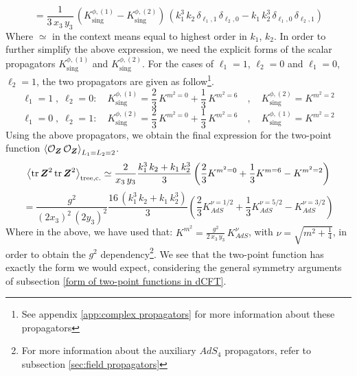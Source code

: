 %
%
\begin{equation}
=
\frac{1}{3 \, x_3 \, y_3} \,
\left(
K^{\phi,(1)}_{\mathrm{sing}}
-
K^{\phi,(2)}_{\mathrm{sing}}
\right) \, 
\left(
k_1^3 \, k_2 \, 
\delta_{\ell_1,1} \, \delta_{\ell_2,0}
-
k_1 \, k_2^3 \,
\delta_{\ell_1,0} \, \delta_{\ell_2,1}
\right)
\end{equation}
%
%
Where $\simeq$ in the context means equal to highest order in $k_1$, $k_2$. In order to further simplify the above expression, we need the explicit forms of the scalar propagators $K^{\phi,(1)}_{\mathrm{sing}}$ and $K^{\phi,(2)}_{\mathrm{sing}}$. For the cases of $\ell_1 = 1$, $\ell_2 = 0$ and $\ell_1 = 0$, $\ell_2 = 1$, the two propagators are given as follow\footnote{See appendix \ref{app:complex propagators} for more information about these propagators}.
%
%
\begin{equation}
\ell_1 = 1 \; , \; \ell_2 = 0 : \quad
%
K^{\phi,(1)}_{\mathrm{sing}}
=
\frac{2}{3} \, K^{m^2 = 0}
+
\frac{1}{3} \, K^{m^2 = 6}
%
\quad , \quad
%
K^{\phi,(2)}_{\mathrm{sing}}
=
K^{m^2 = 2}
\end{equation}
%
%
\begin{equation}
\ell_1 = 0 \; , \; \ell_2 = 1 : \quad
%
K^{\phi,(2)}_{\mathrm{sing}}
=
\frac{2}{3} \, K^{m^2 = 0}
+
\frac{1}{3} \, K^{m^2 = 6}
%
\quad , \quad
%
K^{\phi,(1)}_{\mathrm{sing}}
=
K^{m^2 = 2}
\end{equation}
%
%
Using the above propagators, we obtain the final expression for the two-point function $\expval{\mathcal{O}_{\boldsymbol{Z}} \, \mathcal{O}_{\boldsymbol{Z}}}_{L_1=L_2=2}$.
%
%
\begin{equation*}
\expval{\tr \boldsymbol{Z}^2 \tr \boldsymbol{Z}^2}_{\mathrm{tree,c.}}
\simeq
\frac{2}{x_3 \, y_3} \frac{k_1^3 \, k_2 + k_1 \, k_2^3}{3}
\left(
\frac{2}{3} K^{m^2 = 0}
+
\frac{1}{3} K^{m = 6}
-
K^{m^2 = 2}
\right)
\end{equation*}
%
%
\begin{equation}
= 
\frac{g^2}{(2 x_3)^2 \, (2 y_3)^2} \frac{16 \, (k_1^3 \, k_2 + k_1 \, k_2^3)}{3}
\left(
\frac{2}{3} K_{AdS}^{\nu = 1/2}
+
\frac{1}{3} K_{AdS}^{\nu = 5/2}
-
K_{AdS}^{\nu = 3/2}
\right)
\end{equation}
%
%
Where in the above, we have used that: $K^{m^2} = \frac{g^2}{2 \, x_3 \, y_3} \, K_{AdS}^{\nu}$, with $\nu = \sqrt{m^2 + \frac{1}{4}}$, in order to obtain the $g^2$ dependency\footnote{For more information about the auxiliary $AdS_4$ propagators, refer to subsection \ref{sec:field propagators}}. We see that the two-point function has exactly the form we would expect, considering the general symmetry arguments of subsection \ref{form of two-point functions in dCFT}.
